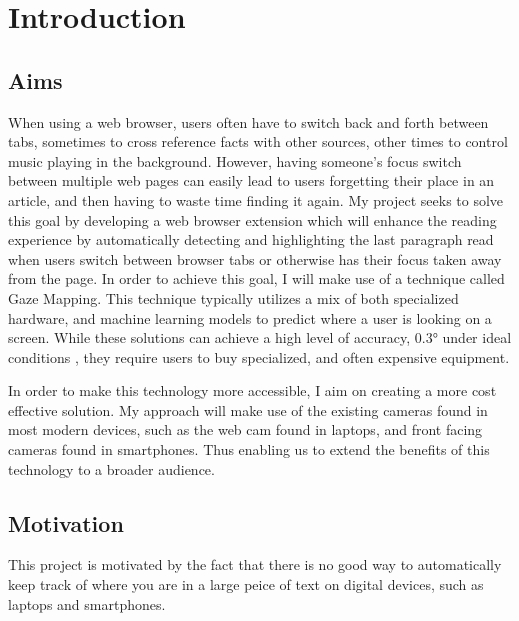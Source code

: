 \documentclass[twocolumn]{report}
\begin{document}
\tableofcontents

\chapter{Introduction}


\section{Aims}


When using a web browser, users often have to switch back and forth between tabs, sometimes to cross reference facts with other sources, other times to control music playing in the background. However, having someone's focus switch between multiple web pages can easily lead to users forgetting their place in an article, and then having to waste time finding it again. My project seeks to solve this goal by developing a web browser extension which will enhance the reading experience by automatically detecting and highlighting the last paragraph read when users switch between browser tabs or otherwise has their focus taken away from the page. In order to achieve this goal, I will make use of a technique called Gaze Mapping. This technique typically utilizes a mix of both specialized hardware, and machine learning models to predict where a user is looking on a screen. While these solutions can achieve a high level of accuracy, $\ang{0.3}$ under ideal conditions \cite{tobiiprofusion}, they require users to buy specialized, and often expensive equipment. 

In order to make this technology more accessible, I aim on creating a more cost effective solution. My approach will make use of the existing cameras found in most modern devices, such as the web cam found in laptops, and front facing cameras found in smartphones. Thus enabling us to extend the benefits of this technology to a broader audience. 

\section{Motivation}

This project is motivated by the fact that there is no good way to automatically keep track of where you are in a large peice of text on digital devices, such as laptops and smartphones. 
\end{document}
